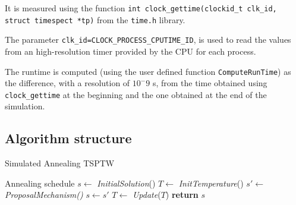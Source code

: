 \begin{homeworkProblem}
It is measured using the function \verb|int clock_gettime(clockid_t clk_id, struct timespect *tp)| from the \verb|time.h| library.

The parameter \verb|clk_id=CLOCK_PROCESS_CPUTIME_ID|, is used to read the values from an high-resolution timer provided by the CPU for each process.

The runtime is computed (using the user defined function \verb|ComputeRunTime|) as the difference, with a resolution of $10^-9$ s, from the time obtained using \verb|clock_gettime| at the beginning and the one obtained at the end of the simulation.

\subsection{Algorithm structure} \label{sec:algstrucSA}
\begin{algorithm}
\caption{Simulated Annealing TSPTW}
\label{SA:TSPTW}
\begin{algorithmic}
  \Require Annealing schedule
  \State $s \gets$ \emph{InitialSolution}() 
  \State $T \gets$ \emph{InitTemperature}() 
    \State $s' \gets$ \emph{ProposalMechanism()} 
     
      \State $s \gets s'$
    \EndIf
  \State $T \gets$ \emph{Update}($T$) 
\EndWhile
  \State \textbf{return} $s$
\EndProcedure
\end{algorithmic}
\end{algorithm}

\begin{center}
  
\begin{minipage}{.45\textwidth}
\centering
{}
\end{minipage}%
\hspace{1.5cm}
\begin{minipage}{.45\textwidth}
\centering

\end{minipage}
\end{center}
\end{homeworkProblem}
